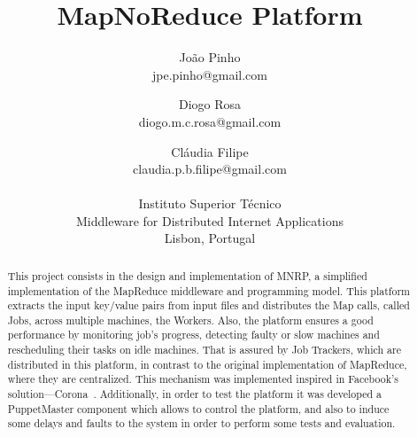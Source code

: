 \documentclass[times, 10pt,twocolumn]{article}
\begin{document}
	\title{MapNoReduce Platform}

	\author{
        João Pinho\\jpe.pinho@gmail.com\and Diogo Rosa\\
        diogo.m.c.rosa@gmail.com\and Cláudia Filipe\\
        claudia.p.b.filipe@gmail.com\\\\
		Instituto Superior Técnico\\
        Middleware for Distributed Internet Applications\\
        Lisbon, Portugal
    }
	\maketitle
	\thispagestyle{empty}


	\begin{abstract}
		This project consists in the design and implementation of \ac{MNRP}, a simplified implementation of the MapReduce middleware and programming model. This platform extracts the input key/value pairs from input files and distributes the Map calls, called Jobs, across multiple machines, the Workers.
		Also, the platform ensures a good performance by monitoring job's progress, detecting faulty or slow machines and rescheduling their tasks on idle machines. That is assured by Job Trackers, which are distributed in this platform, in contrast to the original implementation of MapReduce, where they are centralized. This mechanism was implemented inspired in Facebook's solution—Corona~\cite{ChingFacebook2012}.
		Additionally, in order to test the platform it was developed a PuppetMaster component which allows to control the platform, and also to induce some delays and faults to the system in order to perform some tests and evaluation.
	\end{abstract}
\end{document}
